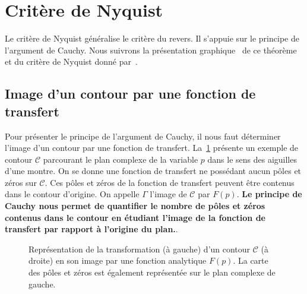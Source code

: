 \section{Critère de Nyquist}
Le critère de Nyquist généralise le critère du revers.
Il s'appuie sur le principe de l'argument de Cauchy.
Nous suivrons la présentation \og graphique\fg~ de ce théorème 
et du critère de Nyquist donné par~\cite{reg,katkim}. 
\subsection{Image d'un contour par une fonction de transfert}
Pour présenter le principe de l'argument de Cauchy, il nous faut déterminer
l'image d'un contour par une fonction de transfert. 
La~\cref{fig-contour_cauchy} présente un exemple de contour $\mathcal{C}$ 
parcourant le plan complexe de la variable $p$ dans le sens des aiguilles 
d'une montre. On se donne une fonction de transfert ne possédant aucun pôles 
et zéros sur $\mathcal{C}$. 
Ces pôles et zéros de la fonction de transfert peuvent être contenus dans le 
contour d'origine. On appelle $\Gamma$ l'image de $\mathcal{C}$ par $F(p)$. 
\textbf{Le principe de Cauchy nous permet de quantifier le nombre de pôles et 
zéros contenus dans le contour en étudiant l'image de la fonction de transfert 
par rapport à l'origine du plan.}.
\begin{figure}[!h]
    \centering
    
    \caption{Représentation de la transformation (à gauche) d'un contour 
             $\mathcal{C}$ (à droite) en son image par une fonction analytique 
             $F(p)$. La carte des pôles et zéros est également représentée 
             sur le plan complexe de gauche.
    \label{fig-contour_cauchy}}
\end{figure}

